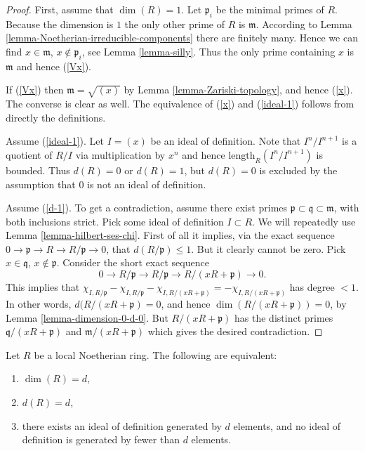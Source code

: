 \begin{proof}
First, assume that $\dim(R) = 1$.
Let $\mathfrak p_i$ be the minimal primes of $R$.
Because the dimension is $1$ the only other prime of $R$
is $\mathfrak m$.
According to Lemma \ref{lemma-Noetherian-irreducible-components}
there are finitely many. Hence we can find $x \in \mathfrak m$,
$x \not \in \mathfrak p_i$, see Lemma \ref{lemma-silly}.
Thus the only prime containing $x$ is $\mathfrak m$ and
hence (\ref{Vx}).

\medskip\noindent
If (\ref{Vx}) then $\mathfrak m = \sqrt{(x)}$ by
Lemma \ref{lemma-Zariski-topology}, and hence (\ref{x}).
The converse is clear as well.
The equivalence of (\ref{x}) and (\ref{ideal-1}) follows
from directly the definitions.

\medskip\noindent
Assume (\ref{ideal-1}).
Let $I = (x)$ be an ideal of definition.
Note that $I^n/I^{n+1}$ is a quotient of $R/I$ via multiplication
by $x^n$ and hence $\text{length}_R(I^n/I^{n+1})$ is bounded.
Thus $d(R) = 0$ or $d(R) = 1$, but $d(R)=0$ is excluded
by the assumption that $0$ is not an ideal of definition.

\medskip\noindent
Assume (\ref{d-1}). To get a contradiction, assume there
exist primes $\mathfrak p \subset \mathfrak q \subset \mathfrak m$,
with both inclusions strict. Pick some ideal of definition $I \subset R$.
We will repeatedly use
Lemma \ref{lemma-hilbert-ses-chi}. First of all
it implies, via the exact sequence
$0 \to \mathfrak p \to R \to R/\mathfrak p \to 0$,
that $d(R/\mathfrak p) \leq 1$. But it clearly cannot
be zero. Pick $x\in \mathfrak q$, $x\not \in \mathfrak p$.
Consider the short exact sequence
$$
0 \to R/\mathfrak p \to R/\mathfrak p \to R/(xR + \mathfrak p) \to 0.
$$
This implies that $\chi_{I,R/\mathfrak p} - \chi_{I,R/\mathfrak p}
- \chi_{I, R/(xR + \mathfrak p)} = - \chi_{I, R/(xR + \mathfrak p)}$
has degree $ < 1$. In other words, $d(R/(xR + \mathfrak p) = 0$,
and hence $\dim(R/(xR + \mathfrak p)) = 0$, by
Lemma \ref{lemma-dimension-0-d-0}. But $R/(xR + \mathfrak p)$
has the distinct primes $\mathfrak q/(xR + \mathfrak p)$ and
$\mathfrak m/(xR + \mathfrak p)$ which gives the desired contradiction.
\end{proof}

\begin{proposition}
\label{proposition-dimension}
Let $R$ be a local Noetherian ring.
The following are equivalent:
\begin{enumerate}
\item $\dim(R) = d$,
\label{dim-d}
\item $d(R) = d$,
\label{d-d}
\item there exists an ideal of definition generated by $d$ elements,
and no ideal of definition is generated by fewer than $d$ elements.
\label{ideal-d}
\end{enumerate}
\end{proposition}

